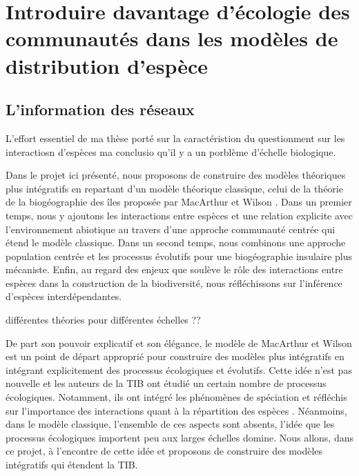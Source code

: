 \section*{Introduire davantage d'écologie des communautés dans les
modèles de distribution
d'espèce}\label{introduire-davantage-duxe9cologie-des-communautuxe9s-dans-les-moduxe8les-de-distribution-despuxe8ce}

\subsection*{L'information des
réseaux}\label{linformation-des-ruxe9seaux}

L'effort essentiel de ma thèse porté sur la caractéristion du
questionment sur les interactiosn d'espèces ma conclusio qu'il y a un
porblème d'échelle biologique.

Dans le projet ici présenté, nous proposons de construire des modèles
théoriques plus intégratifs en repartant d'un modèle théorique
classique, celui de la théorie de la biogéographie des îles proposée par
MacArthur et Wilson \cite{MacArthur1967}. Dans un premier temps, nous y
ajoutons les interactions entre espèces et une relation explicite avec
l'environnement abiotique au travers d'une approche communauté centrée
qui étend le modèle classique. Dans un second temps, nous combinons une
approche population centrée et les processus évolutifs pour une
biogéographie insulaire plus mécaniste. Enfin, au regard des enjeux que
soulève le rôle des interactions entre espèces dans la construction de
la biodiversité, nous réfléchissons sur l'inférence d'espèces
interdépendantes.

différentes théories pour différentes échelles ??

De part son pouvoir explicatif et son élégance, le modèle de MacArthur
et Wilson est un point de départ approprié pour construire des modèles
plus intégratifs en intégrant explicitement des processus écologiques et
évolutifs. Cette idée n'est pas nouvelle et les auteurs de la TIB ont
étudié un certain nombre de processus écologiques. Notamment, ils ont
intégré les phénomènes de spéciation \cite{MacArthur1967} et réfléchis
sur l'importance des interactions quant à la répartition des espèces
\cite{MacArthur1984}. Néanmoins, dans le modèle classique, l'ensemble de
ces aspects sont absents, l'idée que les processus écologiques importent
peu aux larges échelles domine. Nous allons, dans ce projet, à
l'encontre de cette idée et proposons de construire des modèles
intégratifs qui étendent la TIB.

